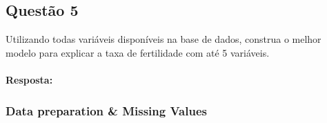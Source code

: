 \documentclass[11pt]{article}
\begin{document}
    \subsection{Questão 5}\label{questuxe3o-5}

Utilizando todas variáveis disponíveis na base de dados, construa o
melhor modelo para explicar a taxa de fertilidade com até 5 variáveis.

    \paragraph{Resposta:}\label{resposta}

    \subsubsection{Data preparation \& Missing
Values}\label{data-preparation-missing-values}
\end{document}
